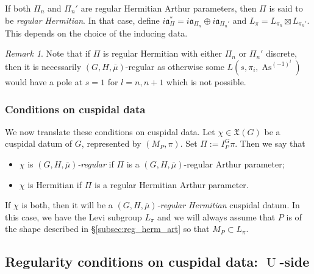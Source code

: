 \documentclass[letterpaper,11pt]{amsart}
\newcommand{\fa}{\mathfrak{a}}
\newcommand{\fX}{\mathfrak{X}}
\newcommand{\<}{\negthickspace}
\DeclareMathOperator{\U}{U}
\DeclareMathOperator{\As}{As}
\theoremstyle{definition}
\theoremstyle{plain}
\theoremstyle{remark}
\newtheorem{remark}[definition]{Remark}
\numberwithin{equation}{section}
\begin{document}
If both $\Pi_n$ and $\Pi_n'$ are regular Hermitian Arthur parameters, then $\Pi$ is said to be \emph{regular Hermitian}. In that case, define $i \fa_\Pi^* = i \fa_{\Pi_n} \oplus i \fa_{\Pi_n'}$ and $L_\pi=L_{\pi_n} \boxtimes L_{\pi_{n}'}$. This depends on the choice of the inducing data.

\begin{remark}  \label{rem:semi_discrete_regular}
Note that if $\Pi$ is regular Hermitian with either $\Pi_n$ or $\Pi_n'$ discrete, then it is necessarily $(G,H,\overline{\mu})$-regular as
otherwise some $L(s,\pi_i,\As^{(-1)^l})$ would have a pole at $s=1$ for
$l=n,n+1$ which is not possible. 
\end{remark}

\subsubsection{Conditions on cuspidal data}

We now translate these conditions on cuspidal data. Let $\chi \in \fX(G)$ be a cuspidal datum of $G$, represented by $(M_P,\pi)$. Set $\Pi:=I_P^G \pi$. Then we say that 
\begin{itemize}
    \item $\chi$ is \emph{$(G,H,\overline{\mu})$-regular} if $\Pi$ is a $(G,H,\overline{\mu})$-regular Arthur parameter;
    \item $\chi$ is Hermitian if $\Pi$ is a regular Hermitian Arthur parameter.
\end{itemize}
If $\chi$ is both, then it will be a \emph{$(G,H,\overline{\mu})$-regular Hermitian} cuspidal datum. In this case, we have the Levi subgroup $L_\pi$ and we will always assume that $P$ is of the shape described in \S\ref{subsec:reg_herm_art} so that $M_P \subset L_\pi$.


\subsection{Regularity conditions on cuspidal data: $\U$-side}
\label{sec:cusp_data_U}
\end{document}
